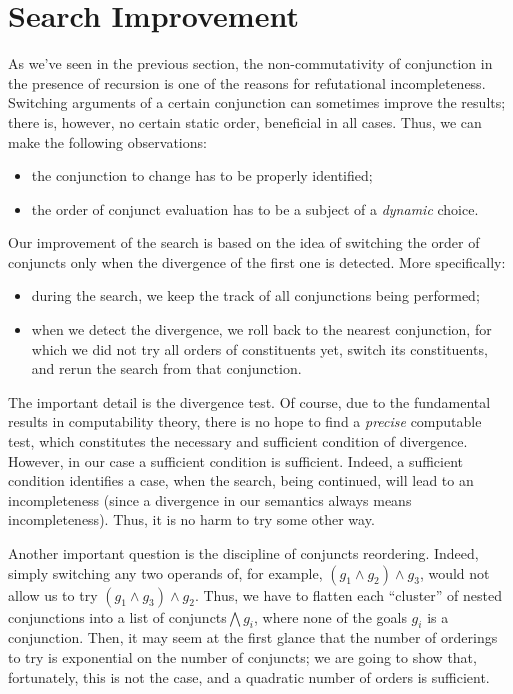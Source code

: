 \section{Search Improvement}
\label{improvement}

As we've seen in the previous section, the non-commutativity of conjunction in the presence of recursion
is one of the reasons for refutational incompleteness. Switching arguments of a certain conjunction
can sometimes improve the results; there is, however, no certain static order, beneficial in all cases.
Thus, we can make the following observations:

\begin{itemize}
\item the conjunction to change has to be properly identified;
\item the order of conjunct evaluation has to be a subject of a \emph{dynamic} choice.
\end{itemize}

Our improvement of the search is based on the idea of switching the order of conjuncts only when
the divergence of the first one is detected. More specifically: 

\begin{itemize}
\item during the search, we keep the track of all conjunctions being performed;
\item when we detect the divergence, we roll back to the nearest conjunction, for which 
we did not try all orders of constituents yet, switch its constituents, and rerun 
the search from that conjunction.
\end{itemize}

The important detail is the divergence test. Of course, due to the fundamental results in computability
theory, there is no hope to find a \emph{precise} computable test, which constitutes the necessary and 
sufficient condition of divergence. However, in our case a sufficient condition is sufficient. Indeed,  
a sufficient condition identifies a case, when the search, being continued, will lead to an incompleteness 
(since a divergence in our semantics always means incompleteness). Thus, it is no harm to try some other way. 

Another important question is the discipline of conjuncts reordering. Indeed, simply switching any two operands
of, for example, \mbox{$(g_1\wedge g_2)\wedge g_3$}, would not allow us to try \mbox{$(g_1\wedge g_3)\wedge g_2$}.
Thus, we have to flatten each ``cluster'' of nested conjunctions into a list of conjuncts\mbox{$\bigwedge g_i$}, 
where none of the goals $g_i$ is a conjunction. Then, it may seem at the first glance that the number of orderings to try 
is exponential on the number of conjuncts; we are going to show that, fortunately, this is not the case, and
a quadratic number of orders is sufficient.

